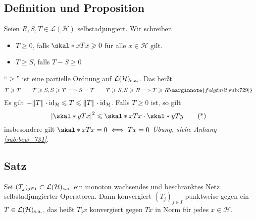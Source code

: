\subsection[Definition und Proposition: Partielle Ordnung auf den selbstadjungierten Operatoren]{Definition und Proposition} %
\label{sub:731}
Seien $R,S,T \in \mathcal{L}(\mathcal{H})$ selbstadjungiert. Wir schreiben 
\begin{itemize}
	\item $T \ge 0$, falls $\skal*{x}{T x} \ge 0$ für alle $x \in \mathcal{H}$ gilt.
	\item $T \ge S$, falls $T-S \ge 0$
\end{itemize}
\enquote{$\ge$} ist eine partielle Ordnung auf $\mathcal{L}(\mathcal{H})_{\mathrm{s.a.}}$. Das heißt 
\[
	T \ge T \qquad T \ge S, S \ge T \Longrightarrow S=T \qquad T \ge S, S \ge R \Longrightarrow T \ge R\marginnote{folgt mit \ref{sub:729}}
\]
Es gilt $-\norm{T} \cdot \id_{\mathcal{H}} \le T  \le \norm{T} \cdot \id_{\mathcal{H}}$. Falls $T \ge 0$ ist, so gilt 
\begin{equation*}
	\abs*{\skal*{y}{T x}}^2 \le  \skal*{x}{T x} \cdot \skal*{y}{T y} \label{eq:731} \tag{*}
\end{equation*}
insbesondere gilt $\skal*{x}{T x}=0 \iff T x=0$
\emph{Übung, siehe Anhang \ref{sub:bew_731}.}\bewende

\subsection[Satz: Konvergenz monoton wachsendes, beschränktes Netz selbstadjungierter Operatoren]{Satz} %
\label{sub:732}
Sei $(T_j)_{j \in I} \subset \mathcal{L}(\mathcal{H})_{\mathrm{s.a.}}$ ein monoton wachsendes und beschränktes Netz selbstadjungierter Operatoren. Dann konvergiert $(T_j)_{j \in I}$
punktweise gegen ein $T \in \mathcal{L}(\mathcal{H})_{\mathrm{s.a.}}$, das heißt $T_j x$ konvergiert gegen $T x$ in Norm für jedes $x \in \mathcal{H}$. 

